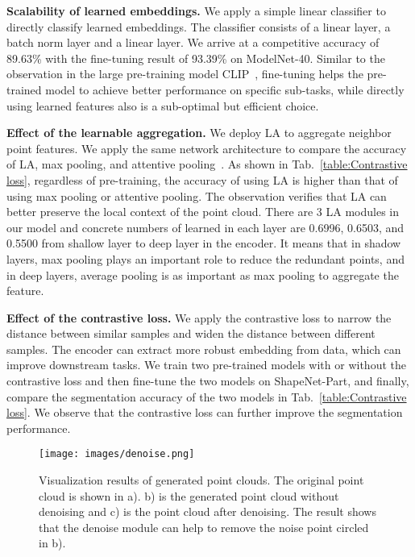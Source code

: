 \documentclass[journal]{IEEEtran}
\begin{document}
\textbf{Scalability of learned embeddings.} We apply a simple linear classifier to directly classify learned embeddings. The classifier consists of a linear layer, a batch norm layer and a linear layer. We arrive at a competitive accuracy of 89.63\% with the fine-tuning result of 93.39\% on ModelNet-40. Similar to the observation in the large pre-training model CLIP~\cite{radford2021learning}, fine-tuning helps the pre-trained model to achieve better performance on specific sub-tasks, while directly using learned features also is a sub-optimal but efficient choice.



\textbf{Effect of the learnable aggregation.} We deploy LA to aggregate neighbor point features. We apply the same network architecture to compare the accuracy of LA, max pooling, and attentive pooling~\cite{hu2020randla}. As shown in Tab.~\ref{table:Contrastive loss}, regardless of pre-training, the accuracy of using LA is higher than that of using max pooling or attentive pooling. 
The observation verifies that LA can better preserve the local context of the point cloud. There are 3 LA modules in our model and concrete numbers of learned  in each layer are  0.6996, 0.6503, and 0.5500 from shallow layer to deep layer in the encoder. It means that in shadow layers, max pooling plays an important role to reduce the redundant points, and in deep layers, average pooling is as important as max pooling to aggregate the feature.

\textbf{Effect of the contrastive loss.}
We apply the contrastive loss to narrow the distance between similar samples and widen the distance between different samples. The encoder can extract more robust embedding from data, which can improve downstream tasks. We train two pre-trained models with or without the contrastive loss and then fine-tune the two models on ShapeNet-Part, and finally, compare the segmentation accuracy of the two models in Tab.~\ref{table:Contrastive loss}. We observe that the contrastive loss can further improve the segmentation performance. 


\begin{figure}[t]
\begin{center}
\texttt{[image: images/denoise.png]}
\end{center}
\vspace{-.15in}
   \caption{Visualization results of generated point clouds. The original point cloud is shown in a). b) is the generated point cloud without denoising and c) is the point cloud after denoising. The result shows that the denoise module can help to remove the noise point circled in b).}
\label{fig:denoise}
\end{figure}
\end{document}
